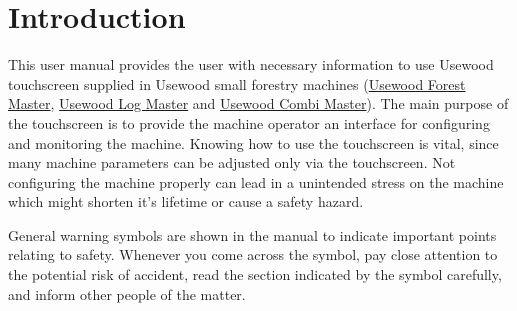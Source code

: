\documentclass[12pt,a4paper,english]{uvmanual}
\begin{document}
\if@twoside
\clearpage
\fi

\setcounter{page}{0} %







\renewcommand\contentsname{Table of content}         %
\setcounter{tocdepth}{2}                      %
\tableofcontents                              %

\cleardoublepage

\newpage             %
\setcounter{page}{1} %
\renewcommand{\chaptername}{} %

\chapter{Introduction}

This user manual provides the user with necessary information to use Usewood touchscreen supplied in Usewood small forestry machines (\href{http://usewood.fi/index.php/en/small-harvesters/forest-master}{Usewood Forest Master}, \href{http://usewood.fi/index.php/en/small-harvesters/log-master-en}{Usewood Log Master} and \href{http://usewood.fi/index.php/en/small-harvesters/combi-master}{Usewood Combi Master}). The main purpose of the touchscreen is to provide the machine operator an interface for configuring and monitoring the machine. Knowing how to use the touchscreen is vital, since many machine parameters can be adjusted only via the touchscreen. Not configuring the machine properly can lead in a unintended stress on the machine which might shorten it's lifetime or cause a safety hazard.

{General warning symbols are shown in the manual to indicate important points relating to safety. Whenever you come across the symbol, pay close attention to the potential risk of accident, read the section indicated by the symbol carefully, and inform other people of the matter.}
\end{document}
